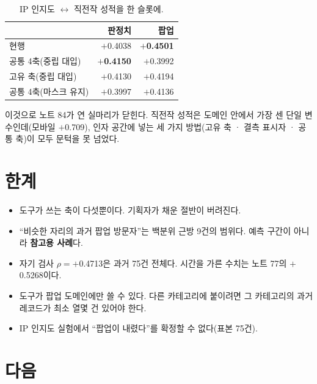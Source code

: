\documentclass[10pt]{article}
\begin{document}
\begin{table}[t]
\centering\tsize
\caption{IP 인지도 $\leftrightarrow$ 직전작 성적을 한 슬롯에.}
\begin{tabular}{lrr}
\toprule
& 판정치 & 팝업 \\
\midrule
현행 & $+$0.4038 & \textbf{$+$0.4501} \\
공통 4축(중립 대입) & \textbf{$+$0.4150} & $+$0.3992 \\
고유 축(중립 대입) & $+$0.4130 & $+$0.4194 \\
공통 4축(마스크 유지) & $+$0.3997 & $+$0.4136 \\
\bottomrule
\end{tabular}
\end{table}


이것으로 노트 84가 연 실마리가 닫힌다. 직전작 성적은 도메인 안에서 가장 센
단일 변수인데(모바일 $+$0.709), 인자 공간에 넣는 세 가지 방법(고유 축 · 결측
표시자 · 공통 축)이 모두 문턱을 못 넘었다.

\section{한계}

\begin{itemize}[leftmargin=1.1em,itemsep=0.15em]
\item 도구가 쓰는 축이 다섯뿐이다. 기획자가 채운 절반이 버려진다.
\item ``비슷한 자리의 과거 팝업 방문자''는 백분위 근방 9건의 범위다.
      예측 구간이 아니라 \textbf{참고용 사례}다.
\item 자기 검사 $\rho=+$0.4713은 과거 75건 전체다. 시간을 가른 수치는
      노트 77의 $+$0.5268이다.
\item 도구가 팝업 도메인에만 쓸 수 있다. 다른 카테고리에 붙이려면 그 카테고리의
      과거 레코드가 최소 열몇 건 있어야 한다.
\item IP 인지도 실험에서 ``팝업이 내렸다''를 확정할 수 없다(표본 75건).
\end{itemize}

\section{다음}
\end{document}
